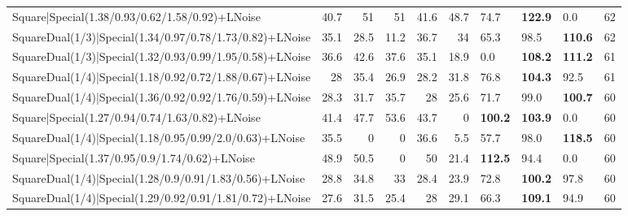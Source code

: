 \begin{tabular}{lrrrrrlllr}
 Square|Special(1.38/0.93/0.62/1.58/0.92)+LNoise                 &            40.7 &            51   &            51   &            41.6 &           48.7 & 74.7            & \textbf{122.9} & 0.0            &           62 \\
 SquareDual(1/3)|Special(1.34/0.97/0.78/1.73/0.82)+LNoise        &            35.1 &            28.5 &            11.2 &            36.7 &           34   & 65.3            & 98.5           & \textbf{110.6} &           62 \\
 SquareDual(1/3)|Special(1.32/0.93/0.99/1.95/0.58)+LNoise        &            36.6 &            42.6 &            37.6 &            35.1 &           18.9 & 0.0             & \textbf{108.2} & \textbf{111.2} &           61 \\
 SquareDual(1/4)|Special(1.18/0.92/0.72/1.88/0.67)+LNoise        &            28   &            35.4 &            26.9 &            28.2 &           31.8 & 76.8            & \textbf{104.3} & 92.5           &           61 \\
 SquareDual(1/4)|Special(1.36/0.92/0.92/1.76/0.59)+LNoise        &            28.3 &            31.7 &            35.7 &            28   &           25.6 & 71.7            & 99.0           & \textbf{100.7} &           60 \\
 Square|Special(1.27/0.94/0.74/1.63/0.82)+LNoise                 &            41.4 &            47.7 &            53.6 &            43.7 &            0   & \textbf{100.2}  & \textbf{103.9} & 0.0            &           60 \\
 SquareDual(1/4)|Special(1.18/0.95/0.99/2.0/0.63)+LNoise         &            35.5 &             0   &             0   &            36.6 &            5.5 & 57.7            & 98.0           & \textbf{118.5} &           60 \\
 Square|Special(1.37/0.95/0.9/1.74/0.62)+LNoise                  &            48.9 &            50.5 &             0   &            50   &           21.4 & \textbf{112.5}  & 94.4           & 0.0            &           60 \\
 SquareDual(1/4)|Special(1.28/0.9/0.91/1.83/0.56)+LNoise         &            28.8 &            34.8 &            33   &            28.4 &           23.9 & 72.8            & \textbf{100.2} & 97.8           &           60 \\
 SquareDual(1/4)|Special(1.29/0.92/0.91/1.81/0.72)+LNoise        &            27.6 &            31.5 &            25.4 &            28   &           29.1 & 66.3            & \textbf{109.1} & 94.9           &           60 \\

\end{tabular}
